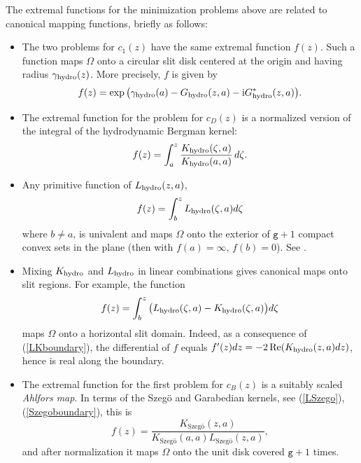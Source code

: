 \documentclass[reqno,12pt]{article}
\theoremstyle{plain}
\theoremstyle{definition}
\numberwithin{equation}{section}
\numberwithin{figure}{section}
\DeclareMathOperator{\re}{Re}
\def\I{\mathrm{i}}
\begin{document}
The extremal functions for the minimization problems above are related to canonical mapping functions, briefly as follows:
\begin{itemize}

\item The two problems for $c_1(z)$ have the same extremal function $f(z)$. Such a function maps $\Omega$ 
onto a circular slit disk centered at the origin and having radius $\gamma_{\rm hydro}(z)$. More precisely, $f$ is given by
\begin{equation}\label{fGG} 
f(z)=\exp\big(\gamma_{\rm hydro}(a) -{G}_{\rm hydro}(z,a)-\I {G}^*_{\rm hydro}(z,a)  \big). 
\end{equation}

\item The extremal function for the problem for $c_D(z)$ is a normalized version of the integral of the 
hydrodynamic Bergman kernel:
\begin{equation}\label{fKK}
f(z)=\int_a^z \frac{{K_{\rm hydro}}(\zeta,a)}{{K_{\rm hydro}}(a,a)}\,d\zeta.
\end{equation}

\item 
Any primitive function of $L_{\rm hydro}(z,a)$, 
\begin{equation}\label{fintL}
f(z)=\int_b^z L_{\rm hydro}(\zeta, a)d\zeta
\end{equation}
where $b\ne a$,
is univalent and maps $\Omega$ onto the exterior of $\texttt{g}+1$ compact convex sets in the plane
(then with $f(a)=\infty$, $f(b)=0$). See \cite{Schiffer-1943, Sario-Oikawa-1969}.

\item Mixing $K_{\rm hydro}$ and $L_{\rm hydro}$ in linear combinations
gives canonical maps onto slit regions. For example, the function
$$
f(z)=\int_b^z \big(L_{\rm hydro}(\zeta,a)- K_{\rm hydro}(\zeta,a)\big) d\zeta
$$
maps $\Omega$ onto a horizontal slit domain. Indeed, as a consequence of 
(\ref{LKboundary}), the differential of $f$ equals $f^\prime (z)dz= -2\re (K_{\rm hydro}(z,a)dz)$, 
hence is real along the boundary. 

\item The extremal function for the first problem for $c_B(z)$ is a suitably scaled {\it Ahlfors map}.
In terms of the Szeg\"o and Garabedian kernels, see (\ref{LSzego}), (\ref{Szegoboundary}), this is
\begin{equation}\label{Ahlfors}
f(z)= \frac{K_\text{Szeg\"o}(z,a)}{K_\text{Szeg\"o}(a,a)L_\text{Szeg\"o}(z,a)},
\end{equation}
and after normalization it maps $\Omega$ onto the unit disk covered $\texttt{g}+1$ times.
  

\end{itemize}
\end{document}

